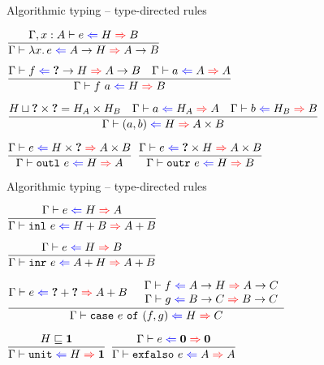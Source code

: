 \documentclass{beamer}
\begin{document}
\begin{frame}{Algorithmic typing -- type-directed rules}

\begin{center}
  $\infrule{\fullhinting{\extend{\Gamma}{x}{A}}{e}{H}{B}}{\hinting{\fun{x}{e}}{\Fun{A}{H}}{\Fun{A}{B}}}$

  \vspace{2em}

  $\infrule{\hinting{f}{\Fun{\Hole}{H}}{\Fun{A}{B}} \quad \hinting{a}{A}{A}}{\hinting{\app{f}{a}}{H}{B}}$

  \vspace{2em}

  $\infrule{\sidecond{\hintlub{H}{\Prod{\Hole}{\Hole}} = \Prod{H_A}{H_B}} \quad \hinting{a}{H_A}{A} \quad \hinting{b}{H_B}{B}}{\hinting{\pair{a}{b}}{H}{\Prod{A}{B}}}$

  \vspace{2em}

  $\infrule{\hinting{e}{\Prod{H}{\Hole}}{\Prod{A}{B}}}{\hinting{\outl{e}}{H}{A}}$ \quad
  $\infrule{\hinting{e}{\Prod{\Hole}{H}}{\Prod{A}{B}}}{\hinting{\outr{e}}{H}{B}}$
\end{center}

\end{frame}

\begin{frame}{Algorithmic typing -- type-directed rules}

\begin{center}
  $\infrule{\hinting{e}{H}{A}}{\hinting{\inl{e}}{\Sum{H}{B}}{\Sum{A}{B}}}$

  \vspace{2em}

  $\infrule{\hinting{e}{H}{B}}{\hinting{\inr{e}}{\Sum{A}{H}}{\Sum{A}{B}}}$

  \vspace{2em}

  $\infrule{\hinting{e}{\Sum{\Hole}{\Hole}}{\Sum{A}{B}} \quad \begin{array}{c} \hinting{f}{\Fun{A}{H}}{\Fun{A}{C}} \\ \hinting{g}{\Fun{B}{C}}{\Fun{B}{C}} \end{array}}{\hinting{\case{e}{f}{g}}{H}{C}}$

  \vspace{2em}

  $\infrule{\sidecond{\hintorder{H}{\Unit}}}{\hinting{\unit}{H}{\Unit}}$ \quad
  $\infrule{\hinting{e}{\Empty}{\Empty}}{\hinting{\exfalso{e}}{A}{A}}$
\end{center}

\end{frame}
\end{document}
